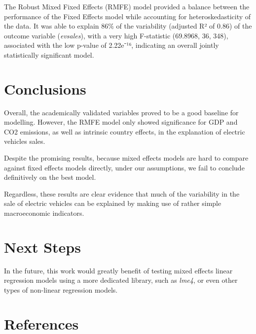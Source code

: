 \documentclass[
]{article}
\begin{document}
The Robust Mixed Fixed Effects (RMFE) model provided a balance between
the performance of the Fixed Effects model while accounting for
heteroskedasticity of the data. It was able to explain 86\% of the
variability (adjusted R² of 0.86) of the outcome variable
(\emph{evsales}), with a very high F-statistic (69.8968, 36, 348),
associated with the low p-value of 2.22e⁻¹⁶, indicating an overall
jointly statistically significant model.

\section{\texorpdfstring{\textbf{Conclusions}}{Conclusions}}\label{conclusions}

Overall, the academically validated variables proved to be a good
baseline for modelling. However, the RMFE model only showed significance
for GDP and CO2 emissions, as well as intrinsic country effects, in the
explanation of electric vehicles sales.

Despite the promising results, because mixed effects models are hard to
compare against fixed effects models directly, under our assumptions, we
fail to conclude definitively on the best model.

Regardless, these results are clear evidence that much of the
variability in the sale of electric vehicles can be explained by making
use of rather simple macroeconomic indicators.

\section{\texorpdfstring{\textbf{Next
Steps}}{Next Steps}}\label{next-steps}

In the future, this work would greatly benefit of testing mixed effects
linear regression models using a more dedicated library, such as
\emph{lme4}, or even other types of non-linear regression models.

\section{\texorpdfstring{\textbf{References}}{References}}\label{references}
\end{document}
